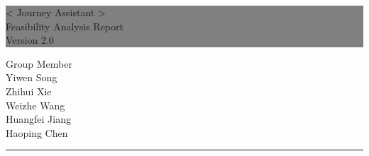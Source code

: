\documentclass[10pt]{article}
\begin{document}

\begin{titlepage} %
	
	
	\colorbox{grey}{
		\parbox[t]{1.1\textwidth}{ %
			\parbox[t]{1.02\textwidth}{ %
				\raggedleft %
				\fontsize{34pt}{40pt}\selectfont %
				\vspace{0.7cm} %
				
				< Journey Assistant >\\
              Feasibility Analysis Report\\
                Version 2.0\\
				
				\vspace{0.7cm} %
			}
		}
	}
	
	\vfill %
	
	
	\parbox[t]{1\textwidth}{ %
		\raggedleft %
		\large %
		{\Large Group Member}\\[4pt] %
        Yiwen Song\\
        Zhihui Xie\\
        Weizhe Wang\\
        Huangfei Jiang\\
        Haoping Chen\\
		
		\hfill\rule{0.2\linewidth}{1pt}%
    }
    
	
\end{titlepage}
\end{document}
